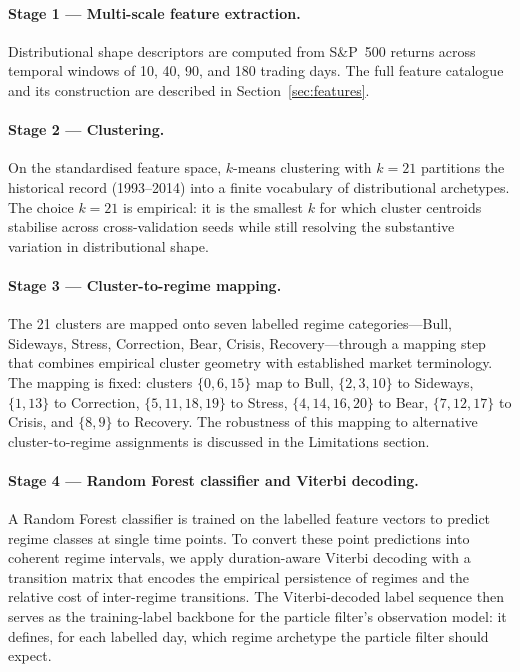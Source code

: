 \documentclass[11pt]{article}
\begin{document}
\paragraph{Stage 1 --- Multi-scale feature extraction.}
Distributional shape descriptors are computed from S\&P~500 returns
across temporal windows of 10, 40, 90, and 180 trading days. The full
feature catalogue and its construction are described in
Section~\ref{sec:features}.

\paragraph{Stage 2 --- Clustering.}
On the standardised feature space, $k$-means clustering with $k=21$
partitions the historical record (1993--2014) into a finite vocabulary
of distributional archetypes. The choice $k=21$ is empirical: it is the
smallest $k$ for which cluster centroids stabilise across
cross-validation seeds while still resolving the substantive variation
in distributional shape.

\paragraph{Stage 3 --- Cluster-to-regime mapping.}
The 21 clusters are mapped onto seven labelled regime categories---Bull,
Sideways, Stress, Correction, Bear, Crisis, Recovery---through a mapping
step that combines empirical cluster geometry with established market
terminology. The mapping is fixed: clusters $\{0,6,15\}$ map to Bull,
$\{2,3,10\}$ to Sideways, $\{1,13\}$ to Correction, $\{5,11,18,19\}$ to
Stress, $\{4,14,16,20\}$ to Bear, $\{7,12,17\}$ to Crisis, and
$\{8,9\}$ to Recovery. The robustness of this mapping to alternative
cluster-to-regime assignments is discussed in the Limitations section.

\paragraph{Stage 4 --- Random Forest classifier and Viterbi decoding.}
A Random Forest classifier is trained on the labelled feature vectors to
predict regime classes at single time points. To convert these point
predictions into coherent regime intervals, we apply duration-aware
Viterbi decoding with a transition matrix that encodes the empirical
persistence of regimes and the relative cost of inter-regime
transitions. The Viterbi-decoded label sequence then serves as the
training-label backbone for the particle filter's observation model: it
defines, for each labelled day, which regime archetype the particle
filter should expect.
\end{document}

